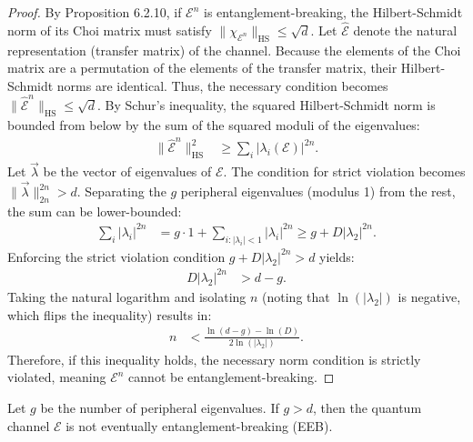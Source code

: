 \begin{proof}
By Proposition 6.2.10, if $\mathcal{E}^n$ is entanglement-breaking, the Hilbert-Schmidt norm of its Choi matrix must satisfy $\|\chi_{\mathcal{E}^n}\|_{\text{HS}} \le \sqrt{d}$. Let $\hat{\mathcal{E}}$ denote the natural representation (transfer matrix) of the channel. Because the elements of the Choi matrix are a permutation of the elements of the transfer matrix, their Hilbert-Schmidt norms are identical. Thus, the necessary condition becomes $\|\hat{\mathcal{E}}^n\|_{\text{HS}} \le \sqrt{d}$. By Schur's inequality, the squared Hilbert-Schmidt norm is bounded from below by the sum of the squared moduli of the eigenvalues:
\begin{align*}
    \|\hat{\mathcal{E}}^n\|_{\text{HS}}^2 &\ge \sum_i |\lambda_i(\mathcal{E})|^{2n}.
\end{align*}
Let $\vec{\lambda}$ be the vector of eigenvalues of $\mathcal{E}$. The condition for strict violation becomes $\|\vec{\lambda}\|_{2n}^{2n} > d$. Separating the $g$ peripheral eigenvalues (modulus 1) from the rest, the sum can be lower-bounded:
\begin{align*}
    \sum_i |\lambda_i|^{2n} &= g \cdot 1 + \sum_{i: |\lambda_i|<1} |\lambda_i|^{2n} \ge g + D|\lambda_2|^{2n}.
\end{align*}
Enforcing the strict violation condition $g + D|\lambda_2|^{2n} > d$ yields:
\begin{align*}
    D|\lambda_2|^{2n} &> d - g.
\end{align*}
Taking the natural logarithm and isolating $n$ (noting that $\ln(|\lambda_2|)$ is negative, which flips the inequality) results in:
\begin{align*}
    n &< \frac{\ln(d - g) - \ln(D)}{2\ln(|\lambda_2|)}.
\end{align*}
Therefore, if this inequality holds, the necessary norm condition is strictly violated, meaning $\mathcal{E}^n$ cannot be entanglement-breaking.
\end{proof}
\begin{prop}
Let $g$ be the number of peripheral eigenvalues. If $g > d$, then the quantum channel $\mathcal{E}$ is not eventually entanglement-breaking (EEB).
\end{prop}

